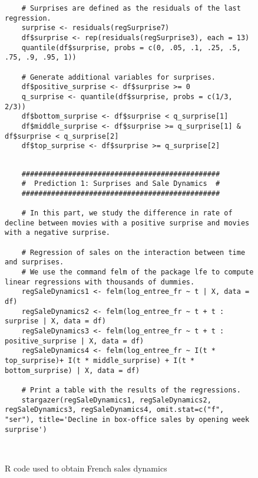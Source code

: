 \documentclass{article}
\begin{document}
\begin{appendices}
\begin{figure}[H]
\begin{lstlisting}
	# Surprises are defined as the residuals of the last regression.
	surprise <- residuals(regSurprise7)
	df$surprise <- rep(residuals(regSurprise3), each = 13)
	quantile(df$surprise, probs = c(0, .05, .1, .25, .5, .75, .9, .95, 1))
	
	# Generate additional variables for surprises.
	df$positive_surprise <- df$surprise >= 0
	q_surprise <- quantile(df$surprise, probs = c(1/3, 2/3))
	df$bottom_surprise <- df$surprise < q_surprise[1]
	df$middle_surprise <- df$surprise >= q_surprise[1] & df$surprise < q_surprise[2]
	df$top_surprise <- df$surprise >= q_surprise[2]
	
	\end{lstlisting}
\end{figure}

\begin{figure}[H]
	\caption{R code used to obtain French sales dynamics}
	\label{code_}
	\begin{lstlisting}
	###############################################
	#  Prediction 1: Surprises and Sale Dynamics  #
	###############################################
	
	# In this part, we study the difference in rate of decline between movies with a positive surprise and movies with a negative surprise.
	
	# Regression of sales on the interaction between time and surprises.
	# We use the command felm of the package lfe to compute linear regressions with thousands of dummies.
	regSaleDynamics1 <- felm(log_entree_fr ~ t | X, data = df)
	regSaleDynamics2 <- felm(log_entree_fr ~ t + t : surprise | X, data = df)
	regSaleDynamics3 <- felm(log_entree_fr ~ t + t : positive_surprise | X, data = df)
	regSaleDynamics4 <- felm(log_entree_fr ~ I(t * top_surprise)+ I(t * middle_surprise) + I(t * bottom_surprise) | X, data = df)
	
	# Print a table with the results of the regressions.
	stargazer(regSaleDynamics1, regSaleDynamics2, regSaleDynamics3, regSaleDynamics4, omit.stat=c("f", "ser"), title='Decline in box-office sales by opening week surprise')
	
	
	\end{lstlisting}
	
	
\end{figure}












\end{appendices}
\end{document}
